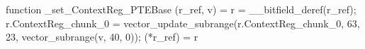 function _set_ContextReg_PTEBase (r_ref, v) = {
    r = __bitfield_deref(r_ref);
    r.ContextReg_chunk_0 = vector_update_subrange(r.ContextReg_chunk_0, 63, 23, vector_subrange(v, 40, 0));
    (*r_ref) = r
}
